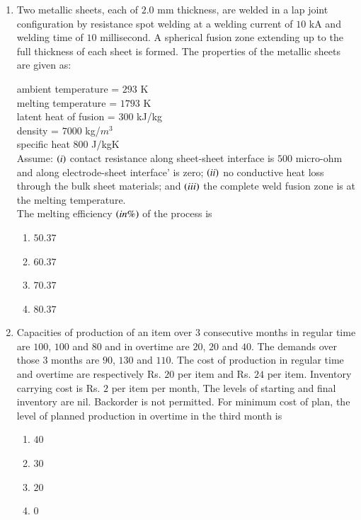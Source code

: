 \documentclass[journal]{IEEEtran}
\begin{document}
\begin{enumerate}[start = 52]
    \item Two metallic sheets, each of $2.0$ mm thickness, are welded in a lap joint configuration by resistance spot welding at a welding current of $10$ kA and welding time of $10$ millisecond. A spherical fusion zone extending up to the full thickness of each sheet is formed. The properties of the metallic sheets are given as:

    ambient temperature = $293$ K \\
    melting temperature = $1793$ K \\
    latent heat of fusion = $300$ kJ/kg\\
    density = $7000$ kg/$m^{3}$ \\
    specific heat $800$ J/kgK\\
    Assume: $\left(i\right)$ contact resistance along sheet-sheet interface is $500$ micro-ohm and along electrode-sheet interface' is zero; $\left(ii\right)$ no conductive heat loss through the bulk sheet materials; and $\left(iii\right)$ the complete weld fusion zone is at the melting temperature.\\

    The melting efficiency $\left(in \%\right)$ of the process is
    \begin{multicols}{4}
        \begin{enumerate}
            \item $50.37$
            \item $60.37$
            \item $70.37$
            \item $80.37$
        \end{enumerate}
    \end{multicols}

    \item Capacities of production of an item over $3$ consecutive months in regular time are $100$, $100$ and $80$ and in overtime are $20$, $20$ and $40$. The demands over those $3$ months are $90$, $130$ and $110$. The cost of production in regular time and overtime are respectively Rs. $20$ per item and Rs. $24$ per item. Inventory carrying cost is Rs. $2$ per item per month, The levels of starting and final inventory are nil. Backorder is not permitted. For minimum cost of plan, the level of planned production in overtime in the third month is
    \begin{multicols}{4}
        \begin{enumerate}
            \item $40$
            \item $30$
            \item $20$
            \item $0$
        \end{enumerate}
    \end{multicols}


\end{enumerate}
\end{document}
